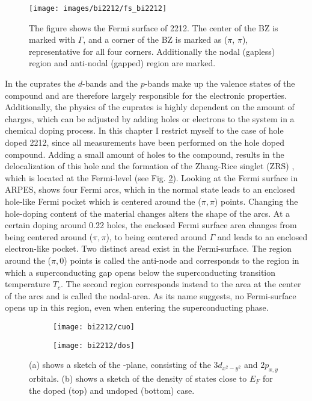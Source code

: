 \begin{figure}
	\centering
	\texttt{[image: images/bi2212/fs\_bi2212]}
	\caption{The figure shows the Fermi surface of 2212. The center of the BZ is marked with $\Gamma$, and a corner of the BZ is marked as ($\pi$, $\pi$), representative for all four corners. Additionally the nodal (gapless) region and anti-nodal (gapped) region are marked.}
	\label{fig:fsbi2212}
\end{figure}


In the cuprates the  $d$-bands and the  $p$-bands make up the valence states of the compound and are therefore largely responsible for the electronic properties.
Additionally, the physics of the cuprates is highly dependent on the amount of charges, which can be adjusted by adding holes or electrons to the system in a chemical doping process.
In this chapter I restrict myself to the case of hole doped 2212, since all measurements have been performed on the hole doped compound.
Adding a small amount of holes to the compound, results in the delocalization of this hole and the formation of the Zhang-Rice singlet (ZRS) \cite{zhang_effective_1988}, which is located at the Fermi-level (see Fig. \ref{fig:cuo_dos}).
Looking at the Fermi surface in ARPES, shows four Fermi arcs, which in the normal state leads to an enclosed hole-like Fermi pocket which is centered around the ($\pi, \pi$) points.
Changing the hole-doping content of the material changes alters the shape of the arcs.
At a certain doping around 0.22 holes, the enclosed Fermi surface area changes from being centered around ($\pi, \pi$), to being centered around $\Gamma$ and leads to an enclosed electron-like pocket.
Two distinct aread exist in the Fermi-surface.
The region around the ($\pi, 0$) points is called the anti-node and corresponds to the region in which a superconducting gap opens below the superconducting transition temperature $T_c$.
The second region corresponds instead to the area at the center of the arcs and is called the nodal-area.
As its name suggests, no Fermi-surface opens up in this region, even when entering the superconducting phase.

\begin{figure}[t]
	\centering
	\begin{subfigure}[b]{0.49\textwidth}
		\texttt{[image: bi2212/cuo]}
		\caption{}
	\end{subfigure}
	\begin{subfigure}[b]{0.45\textwidth}
		\texttt{[image: bi2212/dos]}
		\caption{}
	\end{subfigure}
	\caption{(a) shows a sketch of the -plane, consisting of the  $3d_{x^2-y^2}$ and  $2p_{x,y}$ orbitals. (b) shows a sketch of the density of states close to $E_F$ for the doped (top) and undoped (bottom) case.}
	\label{fig:cuo_dos}
\end{figure}

